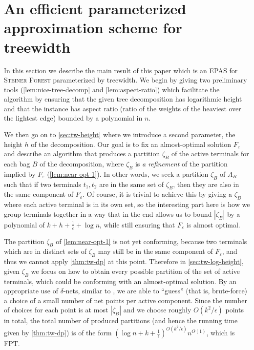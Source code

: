 \documentclass[a4paper]{article}
\theoremstyle{plain}
\newcommand{\eps}{{\varepsilon}}
\newcommand{\pname}[1]{\textsc{#1}}
\newcommand{\SF}{\pname{Steiner Forest}\xspace}
\begin{document}
\section{An efficient parameterized approximation scheme for treewidth}\label{sec:tw}

In this section we describe the main result of this paper which is an EPAS for
\SF parameterized by treewidth. We begin by giving two preliminary tools
(\autoref{lem:nice-tree-decomp} and \autoref{lem:aspect-ratio}) which
facilitate the algorithm by ensuring that the given tree decomposition has
logarithmic height and that the instance has aspect ratio (ratio of the weights
of the heaviest over the lightest edge) bounded by a polynomial in $n$.

We then go on to \autoref{sec:tw-height} where we introduce a second parameter,
the height $h$ of the decomposition. Our goal is to fix an almost-optimal
solution $F_\eps$ and describe an algorithm that produces a partition $\zeta_B$ of the active terminals
for each bag $B$ of the decomposition, where $\zeta_B$ is
\emph{a refinement} of the partition implied by $F_\eps$
(\autoref{lem:near-opt-1}). In other words, we seek a partition $\zeta_B$ of
$A_B$ such that if two terminals $t_1,t_2$ are in the same set of $\zeta_B$,
then they are also in the same component of $F_\eps$. Of course, it is trivial
to achieve this by giving a $\zeta_B$ where each active terminal is in its own
set, so the interesting part here is how we group terminals together in a way
that in the end allows us to bound $|\zeta_B|$ by a polynomial of
$k+h+\frac{1}{\eps}+\log n$, while still ensuring that $F_\eps$ is almost
optimal. 

The partition $\zeta_B$ of \autoref{lem:near-opt-1} is not yet conforming,
because two terminals which are in distinct sets of $\zeta_B$ may still be in
the same component of $F_\eps$, and thus we cannot apply \cref{thm:tw-dp} at this point. 
Therefore in \autoref{sec:tw-log-height}, given $\zeta_B$ we
focus on how to obtain every possible partition of the set of
active terminals, which could be conforming with an almost-optimal solution. By
an appropriate use of $\delta$-nets, similar to \cite{bateni2011approximation},
we are able to ``guess'' (that is, brute-force) a choice of a small number of
net points per active component. Since the number of choices for each point is
at most $|\zeta_B|$ and we choose roughly $O(k^2/\epsilon)$ points in total, the
total number of produced partitions (and hence the running time given by
\autoref{thm:tw-dp}) is of the form $(\log n + k
+\frac{1}{\epsilon})^{O(k^2/\epsilon)}n^{O(1)}$, which is FPT.
\end{document}

